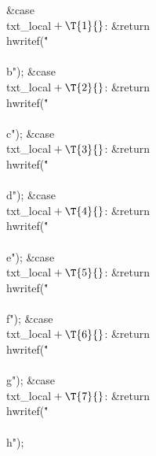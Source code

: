 \4\&{case} \\{txt\_local}${}+\T{1}{}$:\5
\&{return} \\{hwritef}(\.{"\\\\b"});\6
\4\&{case} \\{txt\_local}${}+\T{2}{}$:\5
\&{return} \\{hwritef}(\.{"\\\\c"});\6
\4\&{case} \\{txt\_local}${}+\T{3}{}$:\5
\&{return} \\{hwritef}(\.{"\\\\d"});\6
\4\&{case} \\{txt\_local}${}+\T{4}{}$:\5
\&{return} \\{hwritef}(\.{"\\\\e"});\6
\4\&{case} \\{txt\_local}${}+\T{5}{}$:\5
\&{return} \\{hwritef}(\.{"\\\\f"});\6
\4\&{case} \\{txt\_local}${}+\T{6}{}$:\5
\&{return} \\{hwritef}(\.{"\\\\g"});\6
\4\&{case} \\{txt\_local}${}+\T{7}{}$:\5
\&{return} \\{hwritef}(\.{"\\\\h"});\6

